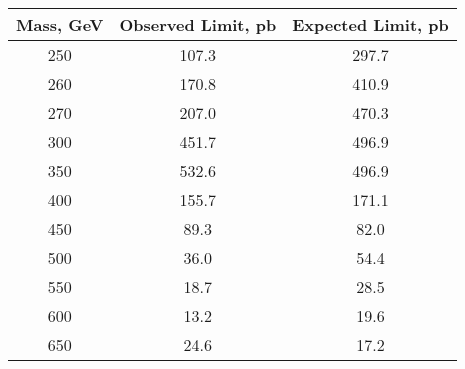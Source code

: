 \begin{table}
\begin{center}
\vspace{1 cm} \ \\
\begin{tabular}{|c|c|c|}
\hline
Mass, GeV &  Observed Limit, pb &  Expected Limit, pb \\
\hline
     250 &               107.3 &               297.7 \\
     260 &               170.8 &               410.9 \\
     270 &               207.0 &               470.3 \\
     300 &               451.7 &               496.9 \\
     350 &               532.6 &               496.9 \\
     400 &               155.7 &               171.1 \\
     450 &                89.3 &                82.0 \\
     500 &                36.0 &                54.4 \\
     550 &                18.7 &                28.5 \\
     600 &                13.2 &                19.6 \\
     650 &                24.6 &                17.2 \\

\end{tabular}
\end{center}
\end{table}
